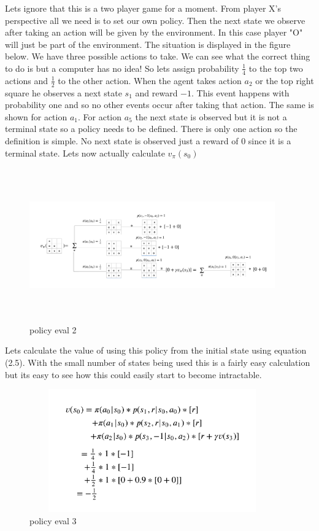 Lets ignore that this is a two player game for a moment. From player X's perspective all we need is to set our own policy. Then the next state we observe after taking an action will be given by the environment. In this case player "O" will just be part of the environment. The situation is displayed in the figure below. We have three possible actions to take. We can see what the correct thing to do is but a computer has no idea! So lets assign probability $\frac{1}{4}$ to the top two actions and $\frac{1}{2}$ to the other action. When the agent takes action $a_{2}$ or the top right square he observes a next state $s_{1}$ and reward $-1$. This event happens with probability one and so no other events occur after taking that action. The same is shown for action $a_{1}$. For action $a_{5}$ the next state is observed but it is not a terminal state so a policy needs to be defined. There is only one action so the definition is simple. No next state is observed just a reward of 0 since it is a terminal state. Lets now actually calculate $v_{\pi}(s_{0})$ 

\begin{figure}[H]
        \centering
        \includegraphics[width=400px,height=250px]{images/PolicyEvaluationExample/value_function.png}
        \caption{policy eval 2}
        \label{fig:my_label}
\end{figure}

Lets calculate the value of using this policy from the initial state using equation (2.5). With the small number of states being used this is a fairly easy calculation but its easy to see how this could easily start to become intractable. 

\begin{figure}[H]
        \centering
        \includegraphics[width=400px,height=200px]{images/PolicyEvaluationExample/value_function_calc.png}
        \caption{policy eval 3}
        \label{fig:my_label}
\end{figure}

